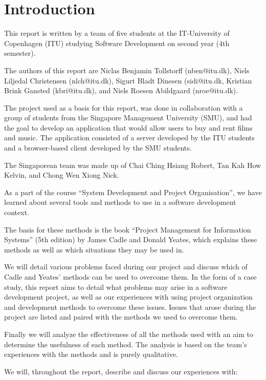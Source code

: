 \section{Introduction}

This report is written by a team of five students at the IT-University of Copenhagen (ITU)
studying Software Development on second year (4th semester).

The authors of this report are Niclas Benjamin Tollstorff (nben@itu.dk), Niels Liljedal
Christensen (nlch@itu.dk), Sigurt Bladt Dinesen (sidi@itu.dk, Kristian Brink Gansted
(kbri@itu.dk), and Niels Roesen Abildgaard (nroe@itu.dk).

The project used as a basis for this report, was done in collaboration with a group of
students from the Singapore Management University (SMU), and had the goal to develop an
application that would allow users to buy and rent films and music. The application consisted
of a server developed by the ITU students and a browser-based client developed by the SMU
students.

The Singaporean team was made up of Chai Ching Hsiang Robert, Tan Kah How Kelvin, and
Chong Wen Xiong Nick.

As a part of the course “System Development and Project Organisation”, we have learned
about several tools and methods to use in a software development context.

The basis for these methods is the book “Project Management for Information Systems”
(5th edition) by James Cadle and Donald Yeates, which explains these methods as well
as which situations they may be used in.

We will detail various problems faced during our project and discuss which of Cadle and
Yeates' methods can be used to overcome them. In the form of a case study, this report
aims to detail what problems may arise in a software development project, as well as our
experiences with using project organization and development methods to overcome these
issues. Issues that arose during the project are listed and paired with the methods we
used to overcome them.

Finally we will analyze the effectiveness of all the methods used with an aim to determine
the usefulness of each method. The analysis is based on the team’s experiences with the
methods and is purely qualitative.

We will, throughout the report, describe and discuss our experiences with:

